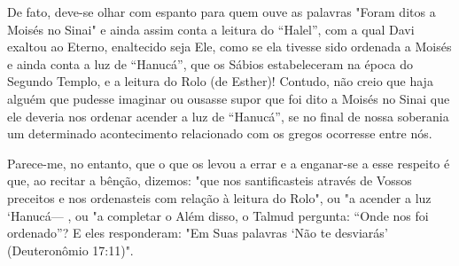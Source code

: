 De fato, deve-se olhar com espanto para quem ouve as palavras "Fo­ram
ditos a Moisés no Sinai" e ainda assim conta a leitura do ``Halel'', com a
qual Davi exaltou ao Eterno, enaltecido seja Ele, como se ela tivesse
sido orde­nada a Moisés e ainda conta a luz de ``Hanucá'', que os Sábios
estabeleceram na época do Segundo Templo, e a leitura do Rolo (de
Esther)! Contudo, não creio que haja alguém que pudesse imaginar ou
ousasse supor que foi dito a Moisés no Sinai que ele deveria nos ordenar
acender a luz de ``Hanucá'', se no final de nossa soberania um determinado
acontecimento relacionado com os gregos ocorresse entre nós.

Parece-me, no entanto, que o que os levou a errar e a enganar-se a esse
respeito é que, ao recitar a bênção, dizemos: "que nos santificasteis
atra­vés de Vossos preceitos e nos ordenasteis com relação à leitura do
Rolo", ou "a acender a luz `Hanucá--- , ou "a completar
o Além disso, o Talmud pergunta: ``Onde nos foi ordenado''? E eles
responderam: "Em Suas palavras `Não te desviarás' (Deuteronômio 17:11)".

